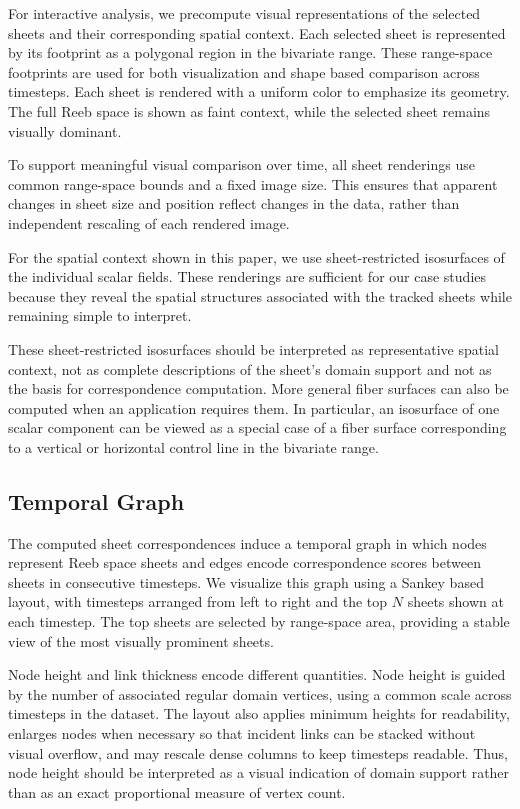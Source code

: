 \documentclass[review]{vgtc}                          %
\begin{document}
For interactive analysis, we precompute visual representations of the selected sheets and their corresponding spatial context. Each selected sheet is represented by its footprint as a polygonal region in the bivariate range. These range-space footprints are used for both visualization and shape based comparison across timesteps. Each sheet is rendered with a uniform color to emphasize its geometry. The full Reeb space is shown as faint context, while the selected sheet remains visually dominant.

To support meaningful visual comparison over time, all sheet renderings use common range-space bounds and a fixed image size. This ensures that apparent changes in sheet size and position reflect changes in the data, rather than independent rescaling of each rendered image.

For the spatial context shown in this paper, we use sheet-restricted isosurfaces of the individual scalar fields. These renderings are sufficient for our case studies because they reveal the spatial structures associated with the tracked sheets while remaining simple to interpret.

These sheet-restricted isosurfaces should be interpreted as representative spatial context, not as complete descriptions of the sheet's domain support and not as the basis for correspondence computation. More general fiber surfaces can also be computed when an application requires them. In particular, an isosurface of one scalar component can be viewed as a special case of a fiber surface corresponding to a vertical or horizontal control line in the bivariate range.



\subsection{Temporal Graph}

The computed sheet correspondences induce a temporal graph in which nodes represent Reeb space sheets and edges encode correspondence scores between sheets in consecutive timesteps. We visualize this graph using a Sankey based layout, with timesteps arranged from left to right and the top $N$ sheets shown at each timestep. The top sheets are selected by range-space area, providing a stable view of the most visually prominent sheets.

Node height and link thickness encode different quantities. Node height is guided by the number of associated regular domain vertices, using a common scale across timesteps in the dataset. The layout also applies minimum heights for readability, enlarges nodes when necessary so that incident links can be stacked without visual overflow, and may rescale dense columns to keep timesteps readable. Thus, node height should be interpreted as a visual indication of domain support rather than as an exact proportional measure of vertex count.
\end{document}
